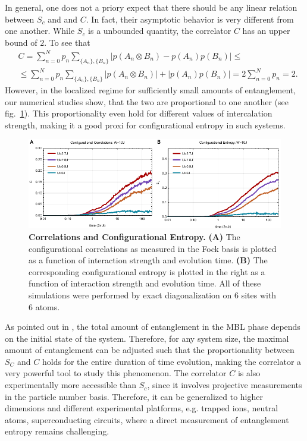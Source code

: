 In general, one does not a priory expect that there should be any linear relation between $S_c$ and and $C$. In fact, their asymptotic behavior is very different from one another. While $S_c$ is a unbounded quantity, the correlator $C$ has an upper bound of $2$. To see that
\begin{equation}
\begin{aligned}
&C = \sum_{n=0}^{N}p_n \sum_{\{A_{n}\},\{B_{n}\}}\left| p(A_{n} \otimes B_{n}) - p(A_{n}) p(B_{n}) \right| \leq \\
&\leq  \sum_{n=0}^{N}p_n \sum_{\{A_{n}\},\{B_{n}\}}\left| p(A_{n} \otimes B_{n})\right| + \left| p(A_{n}) p(B_{n}) \right|  = 2 \sum_{n=0}^{N}p_n  = 2.
\end{aligned}
\end{equation}
However, in the localized regime for sufficiently small amounts of entanglement, our numerical studies show, that the two are proportional to one another (see fig.~\ref{fig:MBL_c_Sc}). This proportionality even hold for different values of intercalation strength, making it a good proxi for configurational entropy in such systems.
\begin{figure}[t]
	\centering
	\includegraphics{figures/MBL_C_SC.pdf}
	\caption{\label{fig:MBL_c_Sc} \textbf{Correlations and Configurational Entropy.} {\bf (A)} The configurational correlations  as measured in the Fock basis is plotted as a function of interaction strength and evolution time. {\bf (B)} The corresponding configurational entropy is plotted in the right as a function of interaction strength and evolution time.  All of these simulations were performed by exact diagonalization on 6 sites with 6 atoms.}
\end{figure}

As pointed out in \cite{huse saturated value of entanglement}, the total amount of entanglement in the MBL phase depends on the initial state of the system. Therefore, for any system size, the maximal amount of entanglement can be adjusted such that the proportionality between $S_C$ and $C$ holds for the entire duration of time evolution, making the correlator a very powerful tool to study this phenomenon. The correlator $C$ is also experimentally more accessible than $S_c$, since it involves projective measurements in the particle number basis. Therefore, it can be generalized to higher dimensions and different experimental platforms, e.g. trapped ions, neutral atoms, superconducting circuits, where a direct measurement of entanglement entropy remains challenging.

